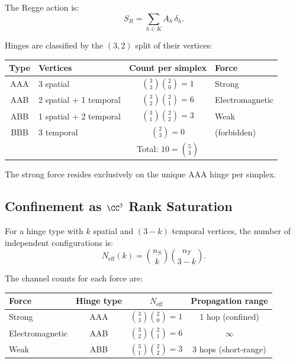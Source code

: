 \noindent
The Regge action \cite{Regge} is:
\begin{equation}
\boxed{S_R = \sum_{h \in K} A_h\, \delta_h.}
\label{eq:Regge_YM}
\end{equation}

Hinges are classified by the $(3,2)$ split of their vertices:

\begin{center}
\begin{tabular}{clcl}
\hline
Type & Vertices & Count per simplex & Force \\
\hline
AAA & 3 spatial & $\binom{3}{3}\binom{2}{0} = 1$ & Strong \\
AAB & 2 spatial $+$ 1 temporal & $\binom{3}{2}\binom{2}{1} = 6$ &
  Electromagnetic \\
ABB & 1 spatial $+$ 2 temporal & $\binom{3}{1}\binom{2}{2} = 3$ &
  Weak \\
BBB & 3 temporal & $\binom{2}{3} = 0$ & (forbidden) \\
\hline
& & Total: $10 = \binom{5}{3}$ & \\
\hline
\end{tabular}
\end{center}

\noindent
The strong force resides exclusively on the unique AAA hinge per simplex.

\subsection{Confinement as $\CC^3$ Rank Saturation}
\label{sec:confinement}

\begin{definition}
For a hinge type with $k$ spatial and $(3-k)$ temporal vertices, the
number of independent configurations is:
\begin{equation}
N_{\mathrm{eff}}(k) = \binom{n_S}{k} \binom{n_T}{3-k}.
\end{equation}
\end{definition}

\noindent
The channel counts for each force are:

\begin{center}
\begin{tabular}{lccc}
\hline
Force & Hinge type & $N_{\mathrm{eff}}$ & Propagation range \\
\hline
Strong & AAA & $\binom{3}{3}\binom{2}{0} = 1$ & 1 hop (confined) \\
Electromagnetic & AAB & $\binom{3}{2}\binom{2}{1} = 6$ & $\infty$ \\
Weak & ABB & $\binom{3}{1}\binom{2}{2} = 3$ & 3 hops (short-range) \\
\hline
\end{tabular}
\end{center}

